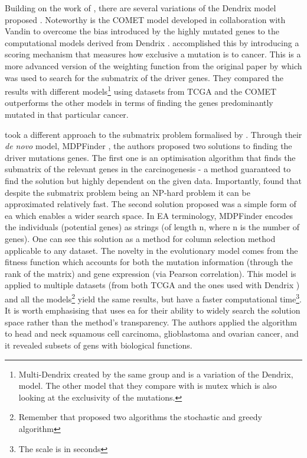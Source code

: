 Building on the work of \citeauthor{Vandin2012-cf}, there are several variations of the Dendrix model proposed \citep{Leiserson2013-da,Szczurek2014-dh,Leiserson2015-yk}. Noteworthy is the COMET \citep{Leiserson2015-yk} model developed in collaboration with Vandin to overcome the bias introduced by the highly mutated genes to the computational models derived from Dendrix \citep{Vandin2012-ns}. \cite{Leiserson2015-yk} accomplished this by introducing a scoring mechanism that measures how exclusive a mutation is to cancer. This is a more advanced version of the weighting function from the original paper by \citet{Vandin2012-cf} which was used to search for the submatrix of the driver genes. They compared the results with different models\footnote{Multi-Dendrix \citep{Leiserson2013-da} created by the same group and is a variation of the Dendrix, \citet{Vandin2012-cf} model. The other model that they compare with is mutex \citep{Babur2015-qk} which is also looking at the exclusivity of the mutations.} using datasets from TCGA and the COMET outperforms the other models \citep{Leiserson2013-da,Szczurek2014-dh} in terms of finding the genes predominantly mutated in that particular cancer.

\citet{Zhao2012-wj} took a different approach to the submatrix problem formalised by \citet{Vandin2012-cf}. Through their \textit{de novo} model, MDPFinder \citep{Zhao2012-wj}, the authors proposed two solutions to finding the driver mutations genes. The first one is an optimisation algorithm that finds the submatrix of the relevant genes in the carcinogenesis - a method guaranteed to find the solution but highly dependent on the given data. Importantly, \citet{Zhao2012-wj} found that despite the submatrix problem being an NP-hard problem \citep{Vandin2012-cf} it can be approximated relatively fast. The second solution proposed was a simple form of \acrlong{ea} which enables a wider search space. In EA terminology, MDPFinder encodes the individuals (potential genes) as strings (of length n, where n is the number of genes). One can see this solution as a method for column selection method applicable to any dataset. The novelty in the evolutionary model comes from the fitness function which accounts for both the mutation information (through the rank of the matrix) and gene expression (via Pearson correlation). This model is applied to multiple datasets (from both TCGA and the ones used with Dendrix \citep{Vandin2012-cf}) and all the models\footnote{Remember that \citet{Vandin2012-cf} proposed two algorithms the stochastic and greedy algorithm} yield the same results, but \citet{Zhao2012-wj} have a faster computational time\footnote{The scale is in seconds}. It is worth emphasising that \citet{Zhao2012-wj} uses \acrshort{ea} for their ability to widely search the solution space rather than the method's transparency. The authors applied the algorithm to head and neck squamous cell carcinoma, glioblastoma and ovarian cancer, and it revealed subsets of gens with biological functions.

